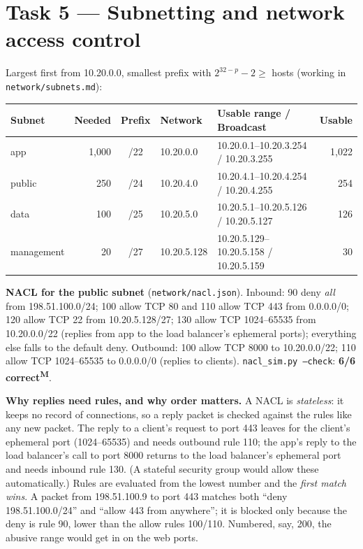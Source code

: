 \documentclass[10pt,a4paper]{article}
\newcommand{\code}[1]{\texttt{\small #1}}
\newcommand{\meas}{\textsuperscript{\textbf{M}}}
\begin{document}
\section{Task 5 --- Subnetting and network access control}
Largest first from 10.20.0.0, smallest prefix with $2^{32-p}-2 \ge$ hosts (working in \code{network/subnets.md}):

\begin{center}\small
\begin{tabular}{lrcllr}
\toprule
Subnet & Needed & Prefix & Network & Usable range / Broadcast & Usable\\
\midrule
app & 1,000 & /22 & 10.20.0.0 & 10.20.0.1--10.20.3.254 / 10.20.3.255 & 1,022\\
public & 250 & /24 & 10.20.4.0 & 10.20.4.1--10.20.4.254 / 10.20.4.255 & 254\\
data & 100 & /25 & 10.20.5.0 & 10.20.5.1--10.20.5.126 / 10.20.5.127 & 126\\
management & 20 & /27 & 10.20.5.128 & 10.20.5.129--10.20.5.158 / 10.20.5.159 & 30\\
\bottomrule
\end{tabular}
\end{center}
\textbf{NACL for the public subnet} (\code{network/nacl.json}). Inbound: 90 deny \emph{all} from
198.51.100.0/24; 100 allow TCP 80 and 110 allow TCP 443 from 0.0.0.0/0; 120 allow TCP 22 from 10.20.5.128/27;
130 allow TCP 1024--65535 from 10.20.0.0/22 (replies from app to the load balancer's ephemeral ports); everything
else falls to the default deny. Outbound: 100 allow TCP 8000 to 10.20.0.0/22; 110 allow TCP 1024--65535 to
0.0.0.0/0 (replies to clients). \code{nacl\_sim.py --check}: \textbf{6/6 correct}\meas{}.

\textbf{Why replies need rules, and why order matters.} A NACL is \emph{stateless}: it keeps no record of
connections, so a reply packet is checked against the rules like any new packet. The reply to a client's request
to port 443 leaves for the client's ephemeral port (1024--65535) and needs outbound rule 110; the app's reply to
the load balancer's call to port 8000 returns to the load balancer's ephemeral port and needs inbound rule 130.
(A stateful security group would allow these automatically.) Rules are evaluated from the lowest number and the
\emph{first match wins}. A packet from 198.51.100.9 to port 443 matches both ``deny 198.51.100.0/24'' and
``allow 443 from anywhere''; it is blocked only because the deny is rule 90, lower than the allow rules 100/110. Numbered,
say, 200, the abusive range would get in on the web ports.
\end{document}
